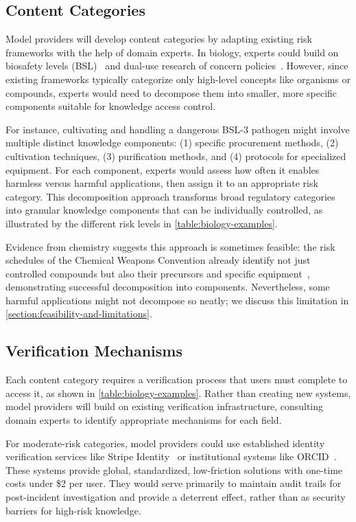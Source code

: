 \documentclass{article}
\theoremstyle{plain}
\theoremstyle{definition}
\theoremstyle{remark}
\begin{document}
\subsection{Content Categories} \label{section:content-categories}

Model providers will develop content categories by adapting existing risk frameworks with the help of domain experts.
In biology, experts could build on biosafety levels (BSL)~\cite{CDC_BMBL_2020} and dual-use research of concern policies~\cite{USG_DURC_2012}.
However, since existing frameworks typically categorize only high-level concepts like organisms or compounds, experts would need to decompose them into smaller, more specific components suitable for knowledge access control.

For instance, cultivating and handling a dangerous BSL-3 pathogen might involve multiple distinct knowledge components: (1) specific procurement methods, (2) cultivation techniques, (3) purification methods, and (4) protocols for specialized equipment.
For each component, experts would assess how often it enables harmless versus harmful applications, then assign it to an appropriate risk category.
This decomposition approach transforms broad regulatory categories into granular knowledge components that can be individually controlled, as illustrated by the different risk levels in \cref{table:biology-examples}.

Evidence from chemistry suggests this approach is sometimes feasible: the risk schedules of the Chemical Weapons Convention already identify not just controlled compounds but also their precursors and specific equipment~\cite{OPCW_CWC_1993}, demonstrating successful decomposition into components.
Nevertheless, some harmful applications might not decompose so neatly; we discuss this limitation in \cref{section:feasibility-and-limitations}.

\subsection{Verification Mechanisms} \label{section:verification-mechanisms}

Each content category requires a verification process that users must complete to access it, as shown in \cref{table:biology-examples}.
Rather than creating new systems, model providers will build on existing verification infrastructure, consulting domain experts to identify appropriate mechanisms for each field.

For moderate-risk categories, model providers could use established identity verification services like Stripe Identity~\cite{stripe_identity_2024} or institutional systems like ORCID~\cite{orcid_2024}.
These systems provide global, standardized, low-friction solutions with one-time costs under \$2 per user.
They would serve primarily to maintain audit trails for post-incident investigation and provide a deterrent effect, rather than as security barriers for high-risk knowledge.
\end{document}
